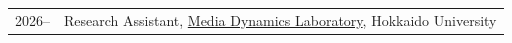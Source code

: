 
\begin{longtable}[l]{@{}p{} p{}}

    2026-- & Research Assistant, \href{https://www-lmd.ist.hokudai.ac.jp/}{Media Dynamics Laboratory}, Hokkaido University \\

\end{longtable}
